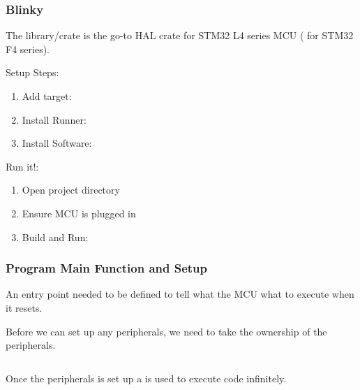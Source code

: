 \documentclass{beamer}
\begin{document}
\begin{frame}
  \frametitle{Blinky}
  The  library/crate is the go-to HAL crate for STM32 L4 series MCU ( for STM32 F4 series).

  Setup Steps:

  \begin{enumerate}
    \item{Add target: }
    \item{Install Runner: }
    \item{Install Software: }
  \end{enumerate}

  Run it!:

  \begin{enumerate}
    \item{Open project directory}
    \item{Ensure MCU is plugged in}
    \item{Build and Run: }
  \end{enumerate}
\end{frame}

\begin{frame}
  \frametitle{Program Main Function and Setup}
  An entry point needed to be defined to tell what the MCU what to execute when it resets.

  

  Before we can set up any peripherals, we need to take the ownership of the peripherals.

  \begin{columns}[t]
    \begin{column}{.5\linewidth}
      
    \end{column}
    \begin{column}{.5\linewidth}
      
    \end{column}
  \end{columns}

  Once the peripherals is set up a  is used to execute code infinitely.
\end{frame}
\end{document}
